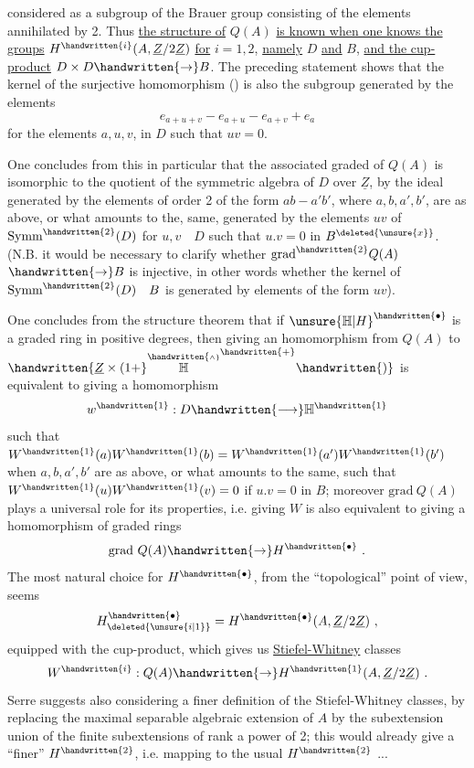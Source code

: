 considered as a subgroup of the Brauer group consisting of the elements annihilated by 2. Thus \uline{the structure of} $Q(A)$ \uline{is known when one knows the groups} $H^{\handwritten{i}}(A,\underline{Z}/2\underline{Z})$ \uline{for} $i=1,2$, \uline{namely} $D$ \uline{and} $B$, \uline{and the cup-product} $D\times D\handwritten{\to}B$. The preceding statement shows  that the kernel of the surjective homomorphism (\handwritten{*}) is also the subgroup generated by the elements
\[
e_{a+u+v}-e_{a+u}-e_{a+v}+e_a
\]
for the elements $a,u,v$, in $D$ such that $uv=0$.

One concludes from this in particular that the associated graded of $Q(A)$ is isomorphic to the quotient of the symmetric algebra of $D$ over $\underline{Z}$, by  the ideal generated by the elements of order 2 of the form $ab-a'b'$, where $a,b,a',b'$, are as above, or what amounts to the, same, generated by the elements $uv$ of $\mathrm{Symm}^{\handwritten{2}}(D)$ for $u,v\quad D$ such that $u.v=0$ in $B^{\deleted{\unsure{x}}}$. (N.B. it would be necessary to clarify whether $\mathrm{grad}^{\handwritten{2}}Q(A)$  $\handwritten{\to}B$ is  injective, in other words whether the kernel of $\mathrm{Symm}^{\handwritten{2}}(D)\quad B$ is generated by elements of the form  $uv$).

One concludes from the  structure theorem that if ${\unsure{\mathbb{H}|H}}^{\handwritten{\bullet}}$ is a graded ring in positive degrees, then giving an  homomorphism from $Q(A)$ to $\handwritten{\underline{Z}\times(1+}\overset{\handwritten{\scriptscriptstyle\wedge}}{\mathbb{H}}^{\handwritten{+}}\handwritten{)}$ is equivalent to giving a homomorphism
\[
w^{\handwritten{1}}:D\handwritten{\longrightarrow}\mathbb{H}^{\handwritten{1}}
\]
such that $W^{\handwritten{1}}(a)W^{\handwritten{1}}(b)=W^{\handwritten{1}}(a')W^{\handwritten{1}}(b')$ when $a,b,a',b'$ are as above, or what amounts to the same, such that $W^{\handwritten{1}}(u)W^{\handwritten{1}}(v)=0$ if $u.v=0$ in $B$;  moreover $\mathrm{grad}\ Q(A)$ plays a universal role for its properties, i.e. giving $W$ is also equivalent to giving a  homomorphism of graded rings
\[
\mathrm{grad}\ Q(A)\handwritten{\to}H^{\handwritten{\bullet}}\ .
\]
The most natural choice for $H^{\handwritten{\bullet}}$, from the ``topological'' point of view, seems
\[
H_{\deleted{\unsure{i|1}}}^{\handwritten{\bullet}}=H^{\handwritten{\bullet}}(A,\underline{Z}/2\underline{Z})\ ,
\]
equipped with the cup-product, which gives us \uline{Stiefel-Whitney} classes
\[
W^{\handwritten{i}}:Q(A)\handwritten{\to}H^{\handwritten{1}}(A,\underline{Z}/2\underline{Z})\ .
\]
Serre suggests  also considering a finer definition of the Stiefel-Whitney classes, by replacing  the maximal separable algebraic extension of $A$ by the subextension union of the finite subextensions of rank a power of 2; this would already give a ``finer'' $H^{\handwritten{2}}$, i.e. mapping to the usual $H^{\handwritten{2}}$ ...
